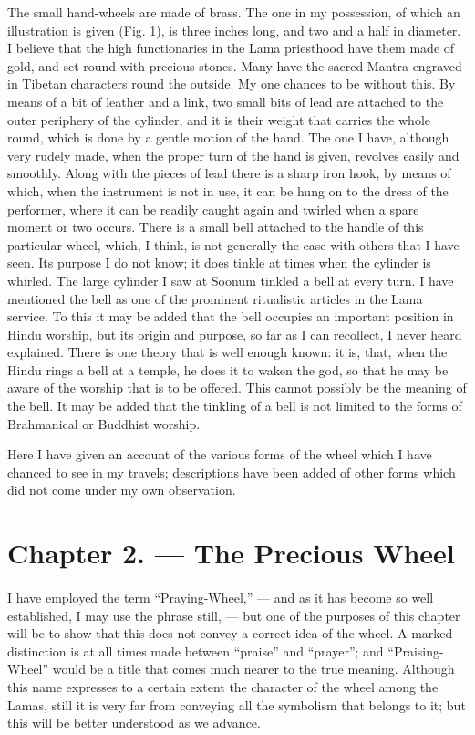 \documentclass[a4paper, 11pt, oneside, polutonikogreek, english]{article}
\begin{document}
The small hand-wheels are made of brass. The one in my possession, of which an illustration is given (Fig. 1), is three inches long, and two and a half in diameter. I believe that the high functionaries in the Lama priesthood have them made of gold, and set round with precious stones. Many have the sacred Mantra engraved in Tibetan characters round the outside. My one chances to be without this. By means of a bit of leather and a link, two small bits of lead are attached to the outer periphery of the cylinder, and it is their weight that carries the whole round, which is done by a gentle motion of the hand. The one I have, although very rudely made, when the proper turn of the hand is given, revolves easily and smoothly. Along with the pieces of lead there is a sharp iron hook, by means of which, when the instrument is not in use, it can be hung on to the dress of the performer, where it can be readily caught again and twirled when a spare moment or two occurs. There is a small bell attached to the handle of this particular wheel, which, I think, is not generally the case with others that I have seen. Its purpose I do not know; it does tinkle at times when the cylinder is whirled. The large cylinder I saw at Soonum tinkled a bell at every turn. I have mentioned the bell as one of the prominent ritualistic articles in the Lama service. To this it may be added that the bell occupies an important position in Hindu worship, but its origin and purpose, so far as I can recollect, I never heard explained. There is one theory that is well enough known: it is, that, when the Hindu rings a bell at a temple, he does it to waken the god, so that he may be aware of the worship that is to be offered. This cannot possibly be the meaning of the bell. It may be added that the tinkling of a bell is not limited to the forms of Brahmanical or Buddhist worship.

Here I have given an account of the various forms of the wheel which I have chanced to see in my travels; descriptions have been added of other forms which did not come under my own observation.
\clearpage
\section{Chapter 2. --- The Precious Wheel}
\paragraph{}
I have employed the term ``Praying-Wheel,'' --- and as it has become so well established, I may use the phrase still, --- but one of the purposes of this chapter will be to show that this does not convey a correct idea of the wheel. A marked distinction is at all times made between ``praise'' and ``prayer''; and ``Praising-Wheel'' would be a title that comes much nearer to the true meaning. Although this name expresses to a certain extent the character of the wheel among the Lamas, still it is very far from conveying all the symbolism that belongs to it; but this will be better understood as we advance.
\end{document}
